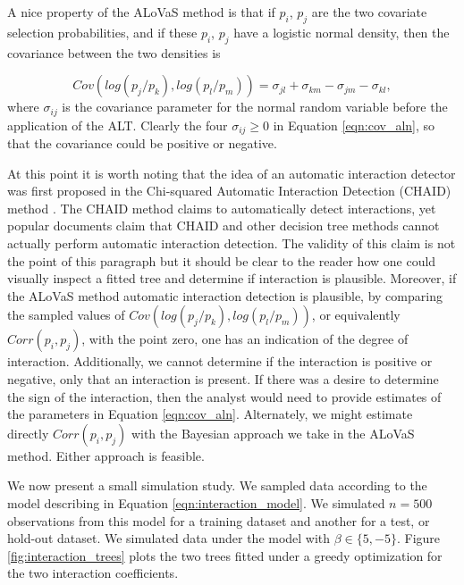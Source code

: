 A nice property of the ALoVaS method is that if $p_i$, $p_j$ are the two covariate selection probabilities, and if these $p_i$, $p_j$ have a logistic normal density, then the covariance between the two densities is 

\begin{equation}\label{eqn:cov_aln}
Cov(log(p_j / p_k), log(p_l / p_m) ) = \sigma_{jl} + \sigma_{km} - \sigma_{jm} - \sigma_{kl},
\end{equation}
where $\sigma_{ij}$ is the covariance parameter for the normal random variable before the application of the ALT. Clearly the four $\sigma_{ij} \geq 0$ in Equation \ref{eqn:cov_aln}, so that the covariance could be positive or negative.  

At this point it is worth noting that the idea of an automatic interaction detector was first proposed in the Chi-squared Automatic Interaction Detection (CHAID)  method \cite{kass1975significance}. The CHAID method claims to automatically detect interactions, yet popular documents \cite{ville2006decision} claim that CHAID and other decision tree methods cannot actually perform automatic interaction detection. The validity of this claim is not the point of this paragraph but it should be clear to the reader how one could visually inspect a fitted tree and determine if interaction is plausible. Moreover, if the ALoVaS method automatic interaction detection is plausible, by comparing the sampled values of $Cov(log(p_j/p_k), log(p_l/p_m) )$, or equivalently $Corr(p_i, p_j)$, with the point zero, one has an indication of the degree of interaction. Additionally, we cannot determine if the interaction is positive or negative, only that an interaction is present. If there was a desire to determine the sign of the interaction, then the analyst would need to provide estimates of the parameters in Equation \ref{eqn:cov_aln}. Alternately, we might estimate directly $Corr(p_i, p_j)$ with the Bayesian approach we take in the ALoVaS method. Either approach is feasible. 

We now present a small simulation study. We sampled data according to the model describing in Equation \ref{eqn:interaction_model}. We simulated $n=500$ observations from this model for a training dataset and another for a test, or hold-out dataset. We simulated data under the model with $\beta \in \{5, -5\}$. Figure \ref{fig:interaction_trees} plots the two trees fitted under a greedy optimization for the two interaction coefficients. 

